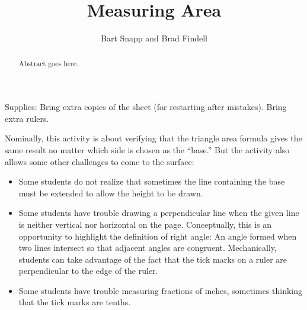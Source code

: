 \documentclass{ximera}
\author{Bart Snapp and Brad Findell}
\title{Measuring Area}
\begin{document}
\begin{abstract}
Abstract goes here.  
\end{abstract}
\maketitle


\begin{instructorIntro}
Supplies: Bring extra copies of the sheet (for restarting after mistakes).  Bring extra rulers. 

Nominally, this activity is about verifying that the triangle area formula gives the same result no matter which
side is chosen as the ``base.''  But the activity also allows some other challenges to come to the surface:  
\begin{itemize}
\item Some students do not realize that sometimes the line containing the base must be 
extended to allow the height to be drawn. 
\item Some students have trouble drawing a perpendicular line when the given line is neither vertical nor 
horizontal on the page.  Conceptually, this is an opportunity to highlight the definition of right angle:  An angle formed when two lines intersect so that adjacent angles are congruent.  Mechanically, students can take advantage of the fact that the tick marks on 
a ruler are perpendicular to the edge of the ruler.  
\item Some students have trouble measuring fractions of inches, sometimes thinking that the tick marks are tenths.  
\end{itemize}
\end{instructorIntro}
\end{document}
